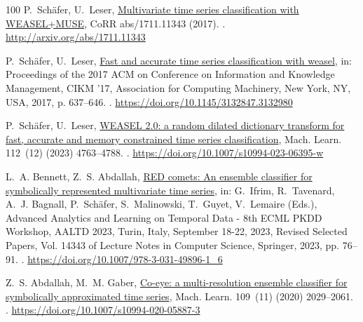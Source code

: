 \documentclass[final,3p,times,twocolumn]{elsarticle}
\begin{document}
\begin{thebibliography}{100}
P.~Sch{\"{a}}fer, U.~Leser, \href{http://arxiv.org/abs/1711.11343}{Multivariate
  time series classification with {WEASEL+MUSE}}, CoRR abs/1711.11343 (2017).
\newblock \href {http://arxiv.org/abs/1711.11343} {}.
\newline\urlprefix\url{http://arxiv.org/abs/1711.11343}

P.~Sch\"{a}fer, U.~Leser, \href{https://doi.org/10.1145/3132847.3132980}{Fast
  and accurate time series classification with weasel}, in: Proceedings of the
  2017 ACM on Conference on Information and Knowledge Management, CIKM '17,
  Association for Computing Machinery, New York, NY, USA, 2017, p. 637–646.
\newblock \href {https://doi.org/10.1145/3132847.3132980}
  {}.
\newline\urlprefix\url{https://doi.org/10.1145/3132847.3132980}

P.~Sch{\"{a}}fer, U.~Leser,
  \href{https://doi.org/10.1007/s10994-023-06395-w}{{WEASEL} 2.0: a random
  dilated dictionary transform for fast, accurate and memory constrained time
  series classification}, Mach. Learn. 112~(12) (2023) 4763--4788.
\newblock \href {https://doi.org/10.1007/S10994-023-06395-W}
  {}.
\newline\urlprefix\url{https://doi.org/10.1007/s10994-023-06395-w}

L.~A. Bennett, Z.~S. Abdallah,
  \href{https://doi.org/10.1007/978-3-031-49896-1\_6}{{RED} comets: An ensemble
  classifier for symbolically represented multivariate time series}, in:
  G.~Ifrim, R.~Tavenard, A.~J. Bagnall, P.~Sch{\"{a}}fer, S.~Malinowski,
  T.~Guyet, V.~Lemaire (Eds.), Advanced Analytics and Learning on Temporal Data
  - 8th {ECML} {PKDD} Workshop, {AALTD} 2023, Turin, Italy, September 18-22,
  2023, Revised Selected Papers, Vol. 14343 of Lecture Notes in Computer
  Science, Springer, 2023, pp. 76--91.
\newblock \href {https://doi.org/10.1007/978-3-031-49896-1\_6}
  {}.
\newline\urlprefix\url{https://doi.org/10.1007/978-3-031-49896-1\_6}

Z.~S. Abdallah, M.~M. Gaber,
  \href{https://doi.org/10.1007/s10994-020-05887-3}{Co-eye: a multi-resolution
  ensemble classifier for symbolically approximated time series}, Mach. Learn.
  109~(11) (2020) 2029--2061.
\newblock \href {https://doi.org/10.1007/S10994-020-05887-3}
  {}.
\newline\urlprefix\url{https://doi.org/10.1007/s10994-020-05887-3}


\end{thebibliography}
\end{document}

